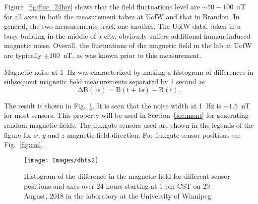 


Figure~\ref{fig:fluc_24hrs} shows that the field fluctuations level are $\sim50-100$~nT for all axes in both the measurement taken at UofW and that in Brandon. In general, the two measurements track one another. The UofW data, taken in a busy building in the middle of a city, obviously suffers additional human-induced magnetic noise. Overall, the fluctuations of the magnetic field in the lab at UofW are typically $\pm100$~nT, as was known prior to this measurement.



Magnetic noise at 1~Hz was characterized by making a histogram of differences in subsequent magnetic field measurements separated by 1 second as
\begin{equation}
    \mathrm{\Delta B (1s)=B(t+1s)-B(t)}.
\end{equation}



The result is shown in Fig.~\ref{fig:hist}. It is seen that the noise width at 1~Hz is $\sim1.5$~nT for most sensors. This property will be used in Section~\ref{sec:mont} for generating random magnetic fields. The fluxgate sensors used are shown in the legends of the figure for $x$, $y$ and $z$ magnetic field direction. For fluxgate sensor positions see Fig.~\ref{fig:coil}.


\makeatletter
\setlength{\@fptop}{0pt}
\makeatother

\begin{figure}[t!]
    \texttt{[image: Images/dbts2]}
    \caption[Histogram of the difference in the magnetic field.]{Histogram of the difference in the magnetic field for different sensor positions and axes over 24 hours starting at 1 pm CST on 29 August, 2018 in the laboratory at the University of Winnipeg.}
    \label{fig:hist}
\end{figure}

